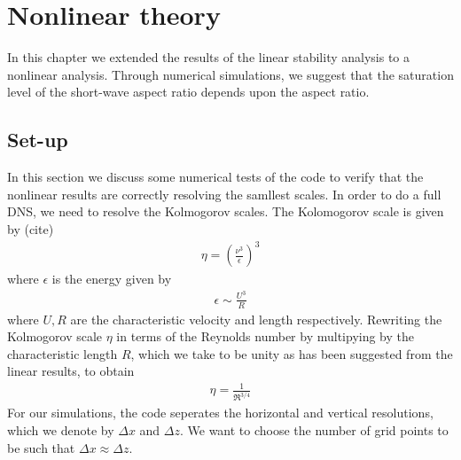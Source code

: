 %
% 
\chapter{Nonlinear theory}

In this chapter we extended the results of the linear stability analysis to a nonlinear analysis. Through numerical simulations, we suggest that the saturation level of the short-wave aspect ratio depends upon the aspect ratio. 


\section{Set-up}
In this section we discuss some numerical tests of the code to verify that the nonlinear results are correctly resolving the samllest scales. 
In order to do a full DNS, we need to resolve the Kolmogorov scales. The Kolomogorov scale is given by (cite)
\begin{align}
\eta = \left(\frac{\nu^{3}}{\epsilon}\right)^{3}
\end{align}
where $\epsilon$ is the energy given by
\begin{align}
\epsilon \sim \frac{U^{3}}{R} 
\end{align}
where $U,R$ are the characteristic velocity and length respectively. Rewriting the Kolmogorov scale $\eta$ in terms of the Reynolds number by multipying by the characteristic length $R$, which we take to be unity as has been suggested from the linear results, to obtain
\begin{align}
\eta = \frac{1}{\Re^{3/4}}
\end{align}
For our simulations, the code seperates the horizontal and vertical resolutions, which we denote by $\Delta x$ and $\Delta z$. We want to choose the number of grid points to be such that $\Delta x \approx \Delta z$. 

